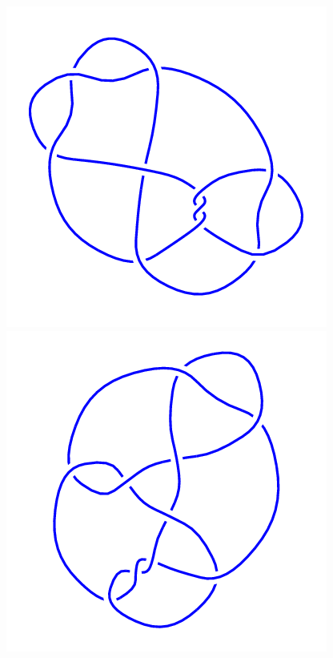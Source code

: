 \begin{figure}[H]
	\begin{minipage}[b]{.18\linewidth}
		\centering
		\includegraphics[width=\linewidth]{../data/10_52.png}
	\end{minipage}
	\begin{minipage}[b]{.18\linewidth}
		\centering
		\includegraphics[width=\linewidth]{../data/10_53.png}

\end{minipage}
\end{figure}
